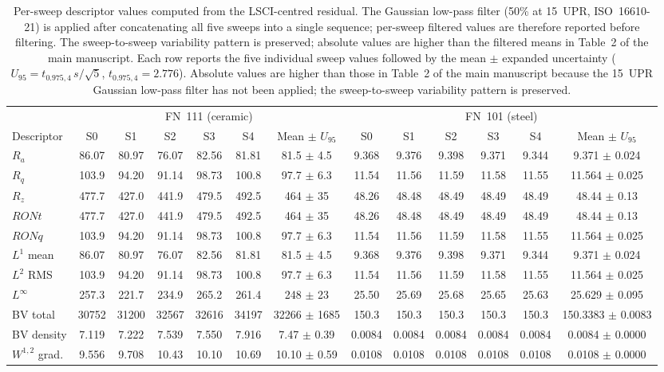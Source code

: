 \begin{table}[H]
\centering
\footnotesize
\setlength{\tabcolsep}{3pt}
\caption{Per-sweep descriptor values computed from the LSCI-centred residual. The Gaussian low-pass filter (50\% at 15~UPR, ISO~16610-21) is applied after concatenating all five sweeps into a single sequence; per-sweep filtered values are therefore reported before filtering. The sweep-to-sweep variability pattern is preserved; absolute values are higher than the filtered means in Table~2 of the main manuscript. Each row reports the five individual sweep values followed by the mean $\pm$ expanded uncertainty ($U_{95}=t_{0.975,4}\,s/\sqrt{5}$, $t_{0.975,4}=2.776$). Absolute values are higher than those in Table~2 of the main manuscript because the 15~UPR Gaussian low-pass filter has not been applied; the sweep-to-sweep variability pattern is preserved.}
\label{tab:supp_per_sweep}
\begin{tabular}{lcccccccccccc}
\toprule
& \multicolumn{6}{c}{FN~111 (ceramic)} & \multicolumn{6}{c}{FN~101 (steel)} \\
\cmidrule(lr){2-7} \cmidrule(lr){8-13}
Descriptor & S0 & S1 & S2 & S3 & S4 & Mean $\pm$ $U_{95}$ & S0 & S1 & S2 & S3 & S4 & Mean $\pm$ $U_{95}$ \\
\midrule
$R_a$ & 86.07 & 80.97 & 76.07 & 82.56 & 81.81 & 81.5 $\pm$ 4.5 & 9.368 & 9.376 & 9.398 & 9.371 & 9.344 & 9.371 $\pm$ 0.024 \\
$R_q$ & 103.9 & 94.20 & 91.14 & 98.73 & 100.8 & 97.7 $\pm$ 6.3 & 11.54 & 11.56 & 11.59 & 11.58 & 11.55 & 11.564 $\pm$ 0.025 \\
$R_z$ & 477.7 & 427.0 & 441.9 & 479.5 & 492.5 & 464 $\pm$ 35 & 48.26 & 48.48 & 48.49 & 48.49 & 48.49 & 48.44 $\pm$ 0.13 \\
$RONt$ & 477.7 & 427.0 & 441.9 & 479.5 & 492.5 & 464 $\pm$ 35 & 48.26 & 48.48 & 48.49 & 48.49 & 48.49 & 48.44 $\pm$ 0.13 \\
$RONq$ & 103.9 & 94.20 & 91.14 & 98.73 & 100.8 & 97.7 $\pm$ 6.3 & 11.54 & 11.56 & 11.59 & 11.58 & 11.55 & 11.564 $\pm$ 0.025 \\
$L^1$ mean & 86.07 & 80.97 & 76.07 & 82.56 & 81.81 & 81.5 $\pm$ 4.5 & 9.368 & 9.376 & 9.398 & 9.371 & 9.344 & 9.371 $\pm$ 0.024 \\
$L^2$ RMS & 103.9 & 94.20 & 91.14 & 98.73 & 100.8 & 97.7 $\pm$ 6.3 & 11.54 & 11.56 & 11.59 & 11.58 & 11.55 & 11.564 $\pm$ 0.025 \\
$L^{\infty}$ & 257.3 & 221.7 & 234.9 & 265.2 & 261.4 & 248 $\pm$ 23 & 25.50 & 25.69 & 25.68 & 25.65 & 25.63 & 25.629 $\pm$ 0.095 \\
BV total & 30752 & 31200 & 32567 & 32616 & 34197 & 32266 $\pm$ 1685 & 150.3 & 150.3 & 150.3 & 150.3 & 150.3 & 150.3383 $\pm$ 0.0083 \\
BV density & 7.119 & 7.222 & 7.539 & 7.550 & 7.916 & 7.47 $\pm$ 0.39 & 0.0084 & 0.0084 & 0.0084 & 0.0084 & 0.0084 & 0.0084 $\pm$ 0.0000 \\
$W^{1,2}$ grad. & 9.556 & 9.708 & 10.43 & 10.10 & 10.69 & 10.10 $\pm$ 0.59 & 0.0108 & 0.0108 & 0.0108 & 0.0108 & 0.0108 & 0.0108 $\pm$ 0.0000 \\
\bottomrule
\end{tabular}
\end{table}
